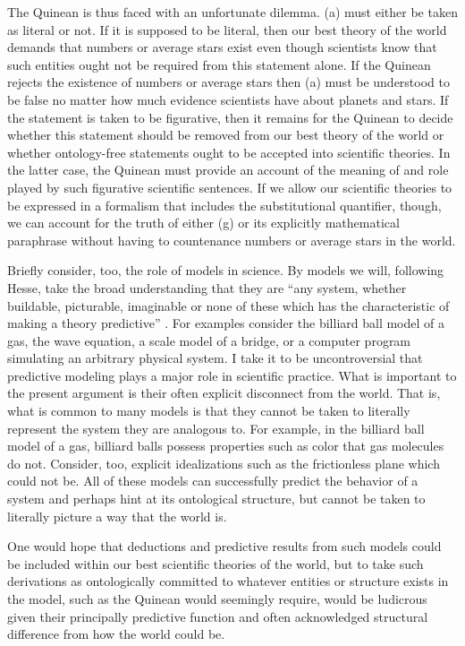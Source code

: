 \documentclass[12pt,a4paper]{article}
\begin{document}
The Quinean is thus faced with an unfortunate dilemma. (a) must either
be taken as literal or not.  If it is supposed to be literal, then our
best theory of the world demands that numbers or average stars exist
even though scientists know that such entities ought not be required
from this statement alone. If the Quinean rejects the existence of
numbers or average stars then (a) must be understood to be false no
matter how much evidence scientists have about planets and stars.  If
the statement is taken to be figurative, then it remains for the
Quinean to decide whether this statement should be removed from our
best theory of the world or whether ontology-free statements ought to
be accepted into scientific theories.  In the latter case, the Quinean
must provide an account of the meaning of and role played by such
figurative scientific sentences. If we allow our scientific theories
to be expressed in a formalism that includes the substitutional
quantifier, though, we can account for the truth of either (g) or its
explicitly mathematical paraphrase without having to countenance
numbers or average stars in the world.  

Briefly consider, too, the role of models in science.  By models we
will, following Hesse, take the broad understanding that they are
``any system, whether buildable, picturable, imaginable or none of
these which has the characteristic of making a theory predictive''
\cite[p.21]{hesse}.  For examples consider the billiard ball model of
a gas, the wave equation, a scale model of a bridge, or a computer
program simulating an arbitrary physical system.  I take it to be
uncontroversial that predictive modeling plays a major role in
scientific practice.  What is important to the present argument is
their often explicit disconnect from the world.  That is, what is
common to many models is that they cannot be taken to literally
represent the system they are analogous to.  For example, in the
billiard ball model of a gas, billiard balls possess properties such
as color that gas molecules do not. Consider, too, explicit
idealizations such as the frictionless plane which could not be.  All
of these models can successfully predict the behavior of a system and
perhaps hint at its ontological structure, but cannot be taken to
literally picture a way that the world is.

One would hope that deductions and predictive results from such models
could be included within our best scientific theories of the world,
but to take such derivations as ontologically committed to whatever
entities or structure exists in the model, such as the Quinean would
seemingly require, would be ludicrous given their principally
predictive function and often acknowledged structural difference from
how the world could be.  
\end{document}
